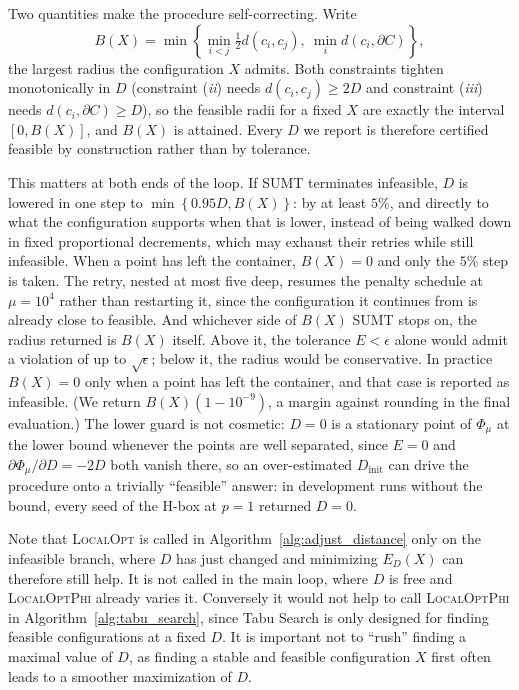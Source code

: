 \documentclass[preprint,12pt]{elsarticle}
\theoremstyle{remark}
\newcommand{\set}[1]{\left\{ #1 \right\}}
\begin{document}
Two quantities make the procedure self-correcting. Write
\begin{equation}
  B(X) = \min \set{\min_{i < j} \tfrac{1}{2} d(c_i, c_j),\ \min_i d(c_i,
  \partial C)},
  \label{eq:bound}
\end{equation}
the largest radius the configuration $X$ admits. Both constraints tighten
monotonically in $D$ (constraint (\textit{ii}) needs $d(c_i, c_j) \ge 2D$ and
constraint (\textit{iii}) needs $d(c_i, \partial C) \ge D$), so the feasible
radii for a fixed $X$ are exactly the interval $[0, B(X)]$, and $B(X)$ is
attained. Every $D$ we report is therefore certified feasible by construction
rather than by tolerance.

This matters at both ends of the loop. If SUMT terminates infeasible, $D$ is
lowered in one step to $\min \set{0.95 D, B(X)}$: by at least $5\%$, and
directly to what the configuration supports when that is lower, instead of being
walked down in fixed proportional decrements, which may exhaust their retries
while still infeasible. When a point has left the container, $B(X) = 0$ and only
the $5\%$ step is taken. The retry, nested at most five deep, resumes the
penalty schedule at $\mu = 10^4$ rather than restarting it, since the
configuration it continues from is already close to feasible. And whichever side
of $B(X)$ SUMT stops on, the radius returned is $B(X)$ itself. Above it, the
tolerance $E < \epsilon$ alone would admit a violation of up to
$\sqrt{\epsilon}$; below it, the radius would be conservative. In practice $B(X)
= 0$ only when a point has left the container, and that case is reported as
infeasible. (We return $B(X) (1 - 10^{-9})$, a margin against rounding in the
final evaluation.) The lower guard is not cosmetic: $D = 0$ is a stationary
point of $\Phi_\mu$ at the lower bound whenever the points are well separated,
since $E = 0$ and $\partial \Phi_\mu / \partial D = -2D$ both vanish there, so
an over-estimated $D_{\text{init}}$ can drive the procedure onto a trivially
``feasible'' answer: in development runs without the bound, every seed of the
H-box at $p = 1$ returned $D = 0$.

Note that \textsc{LocalOpt} is called in Algorithm~\ref{alg:adjust_distance}
only on the infeasible branch, where $D$ has just changed and minimizing
$E_D(X)$ can therefore still help. It is not called in the main loop, where $D$
is free and \textsc{LocalOptPhi} already varies it. Conversely it would not help
to call \textsc{LocalOptPhi} in Algorithm~\ref{alg:tabu_search}, since Tabu
Search is only designed for finding feasible configurations at a fixed $D$. It
is important not to ``rush'' finding a maximal value of $D$, as finding a stable
and feasible configuration $X$ first often leads to a smoother maximization of
$D$.
\end{document}
